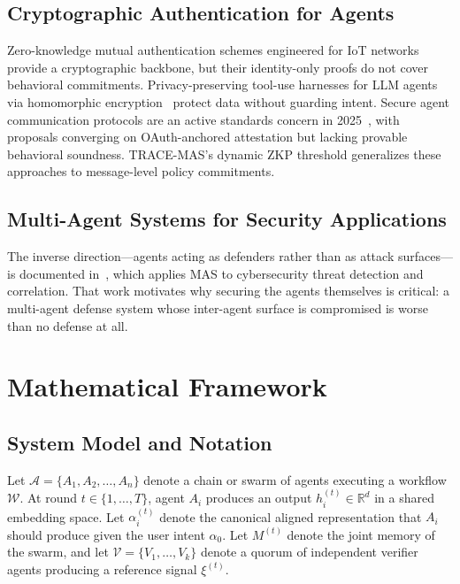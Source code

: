 \documentclass[conference]{IEEEtran}
\begin{document}
\subsection{Cryptographic Authentication for Agents}
Zero-knowledge mutual authentication schemes engineered for IoT
networks~\cite{ref:zpma2024} provide a cryptographic backbone, but
their identity-only proofs do not cover behavioral commitments.
Privacy-preserving tool-use harnesses for LLM agents via homomorphic
encryption~\cite{ref:tdsc2024} protect data without guarding intent.
Secure agent communication protocols are an active standards concern
in 2025~\cite{ref:agentsec2025}, with proposals converging on
OAuth-anchored attestation but lacking provable behavioral soundness.
\textsc{TRACE-MAS}'s dynamic ZKP threshold generalizes these
approaches to message-level policy commitments.

\subsection{Multi-Agent Systems for Security Applications}
The inverse direction---agents acting as defenders rather than as
attack surfaces---is documented in~\cite{ref:access2025multi}, which
applies MAS to cybersecurity threat detection and correlation. That
work motivates why securing the agents themselves is critical: a
multi-agent defense system whose inter-agent surface is compromised
is worse than no defense at all.

\section{Mathematical Framework}
\label{sec:framework}

\subsection{System Model and Notation}
\label{subsec:model}

Let $\mathcal{A} = \{A_1, A_2, \ldots, A_n\}$ denote a chain or swarm of
agents executing a workflow $\mathcal{W}$. At round
$t \in \{1, \ldots, T\}$, agent $A_i$ produces an output
$h_i^{(t)} \in \mathbb{R}^d$ in a shared embedding space. Let
$\alpha_i^{(t)}$ denote the canonical aligned representation that
$A_i$ should produce given the user intent $\alpha_0$. Let $M^{(t)}$
denote the joint memory of the swarm, and let
$\mathcal{V} = \{V_1, \ldots, V_k\}$ denote a quorum of independent
verifier agents producing a reference signal $\xi^{(t)}$.
\end{document}
